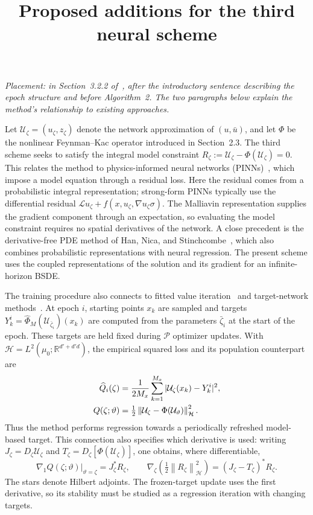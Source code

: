 \documentclass[11pt]{article}
\title{Proposed additions for the third neural scheme}
\author{}
\date{}
\newcommand{\R}{\mathbb R}
\newcommand{\HH}{\mathcal H}
\newcommand{\PP}{\mathcal P}
\newcommand{\norm}[1]{\left\lVert #1\right\rVert}
\begin{document}
\maketitle
\vspace{-2em}

\emph{Placement: in Section~3.2.2 of~\cite{GRS}, after the introductory
sentence describing the epoch structure and before Algorithm~2. The two
paragraphs below explain the method's relationship to existing approaches.}

Let $\mathcal U_\zeta=(u_\zeta,z_\zeta)$ denote the network approximation
of $(u,\bar u)$, and let $\Phi$ be the nonlinear Feynman--Kac operator
introduced in Section~2.3. The third scheme seeks to satisfy the integral
model constraint $R_\zeta:=\mathcal U_\zeta-\Phi(\mathcal U_\zeta)=0$.
This relates the method to physics-informed neural networks
(PINNs)~\cite{RPK}, which impose a model equation through a residual loss.
Here the residual comes from a probabilistic integral representation;
strong-form PINNs typically use the differential residual
$\mathcal L u_\zeta+f(x,u_\zeta,\nabla u_\zeta\sigma)$.
The Malliavin representation supplies the gradient component through
an expectation, so evaluating the model constraint requires no spatial
derivatives of the network. A close precedent is the derivative-free
PDE method of Han, Nica, and Stinchcombe~\cite{HNS}, which also combines
probabilistic representations with neural regression. The present scheme
uses the coupled representations of the solution and its gradient for
an infinite-horizon BSDE.

The training procedure also connects to fitted value iteration~\cite{MS}
and target-network methods~\cite{Mnih}. At epoch $i$, starting points
$x_k$ are sampled and targets
$Y_k^i=\widehat\Phi_M(\mathcal U_{\bar\zeta_i})(x_k)$ are computed from
the parameters $\bar\zeta_i$ at the start of the epoch. These targets
are held fixed during $\PP$ optimizer updates. With
$\HH=L^2(\mu_0;\R^{d'+d'd})$, the empirical squared loss and its
population counterpart are
\begin{align}
 \widehat Q_i(\zeta)
  &=\frac{1}{2M_x}\sum_{k=1}^{M_x}
           |\mathcal U_\zeta(x_k)-Y_k^i|^2,\notag\\
 Q(\zeta;\vartheta)
  &=\tfrac12\norm{\mathcal U_\zeta-\Phi(\mathcal U_\vartheta)}_\HH^2.
                                                        \label{eq:third-loss}
\end{align}
Thus the method performs regression towards a periodically refreshed
model-based target. This connection also specifies which derivative is
used: writing $J_\zeta=D_\zeta\mathcal U_\zeta$ and
$T_\zeta=D_\zeta[\Phi(\mathcal U_\zeta)]$, one obtains, where differentiable,
\begin{equation}
 \left.\nabla_1 Q(\zeta;\vartheta)\right|_{\vartheta=\zeta}
       =J_\zeta^*R_\zeta,
 \qquad
 \nabla_\zeta\!\left(\tfrac12\norm{R_\zeta}_\HH^2\right)
       =(J_\zeta-T_\zeta)^*R_\zeta.                       \label{eq:third-gradient}
\end{equation}
The stars denote Hilbert adjoints. The frozen-target update uses the
first derivative, so its stability must be studied as a regression
iteration with changing targets.
\end{document}

